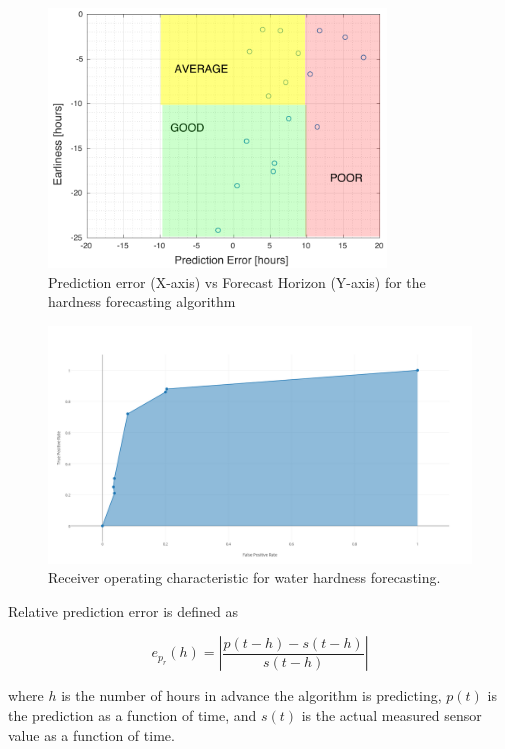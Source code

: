 \begin{figure}[!th]
\centering
\includegraphics[width=0.8\textwidth]{water/prediction_error_plot_154.pdf}
\caption{Prediction error (X-axis) vs Forecast Horizon (Y-axis) for the hardness forecasting algorithm}
\label{fig:prediction_error_plot_154}
\end{figure}

\begin{figure}[!th]
\centering
\includegraphics[width=\textwidth]{water/ROC_154.png}
\caption{Receiver operating characteristic for water hardness forecasting.}
\label{fig:forecastingroc}
\end{figure}

Relative prediction error is defined as

\begin{equation*}
e_{p_r}(h) = \left| \frac{p(t-h)-s(t-h)}{s(t-h)} \right|
\end{equation*}

where $h$ is the number of hours in advance the algorithm is predicting, $p(t)$ is the prediction as a function of time, and $s(t)$ is the actual measured sensor value as a function of time.

